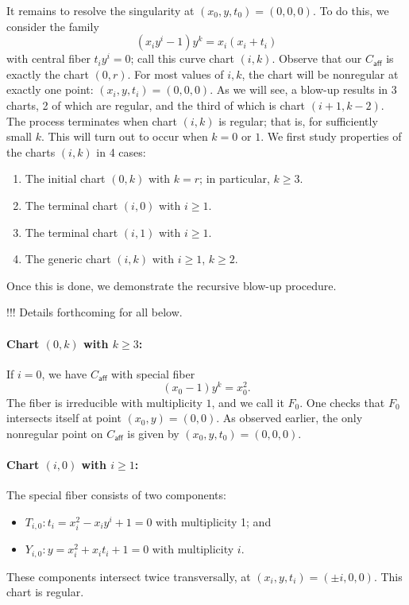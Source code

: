 \documentclass[pagesize,paper=letter]{scrartcl}
\newcommand{\caff}{C_{\textsf{aff}}}
\theoremstyle{plain}
\theoremstyle{definition}
\theoremstyle{remark}
\begin{document}
It remains to resolve the singularity at $(x_0, y, t_0) = (0, 0, 0)$. To do this, we consider the family
\[
(x_iy^i - 1) y^k = x_i(x_i + t_i)
\]
with central fiber $t_iy^i = 0$; call this curve chart $(i,k)$. Observe that our $\caff$ is exactly the chart $(0,r)$. For most values of $i, k$, the chart will be nonregular at exactly one point: $(x_i, y, t_i) = (0, 0, 0)$. As we will see, a blow-up results in 3 charts, 2 of which are regular, and the third of which is chart $(i+1, k-2)$. The process terminates when chart $(i, k)$ is regular; that is, for sufficiently small $k$. This will turn out to occur when $k = 0$ or $1$. We first study properties of the charts $(i, k)$ in 4 cases:
\begin{enumerate}
    \item The initial chart $(0, k)$ with $k = r$; in particular, $k \geq 3$.
    \item The terminal chart $(i, 0)$ with $i \geq 1$.
    \item The terminal chart $(i, 1)$ with $i \geq 1$.
    \item The generic chart $(i, k)$ with $i \geq 1$, $k \geq 2$.
\end{enumerate}
Once this is done, we demonstrate the recursive blow-up procedure.

!!! Details forthcoming for all below.

\paragraph{Chart $(0, k)$ with $k \geq 3$:}
\label{sec:case-i=0}

If $i = 0$, we have $\caff$ with special fiber
\[
(x_0 - 1) y^k = x_0^2.
\]
The fiber is irreducible with multiplicity $1$, and we call it $F_0$. One checks that $F_0$ intersects itself at point $(x_0, y) = (0, 0)$. As observed earlier, the only nonregular point on $\caff$ is given by $(x_0, y, t_0) = (0, 0, 0)$.

\paragraph{Chart $(i, 0)$ with $i \geq 1$:}
\label{sec:case-k=0}

The special fiber consists of two components:
\begin{itemize}
    \item $T_{i,0}: t_i = x_i^2 - x_iy^i + 1 = 0$ with multiplicity 1; and
    \item $Y_{i,0}: y = x_i^2 + x_it_i + 1 = 0$ with multiplicity $i$.
\end{itemize}
These components intersect twice transversally, at $(x_i, y, t_i) = (\pm i, 0, 0)$. This chart is regular.
\end{document}
